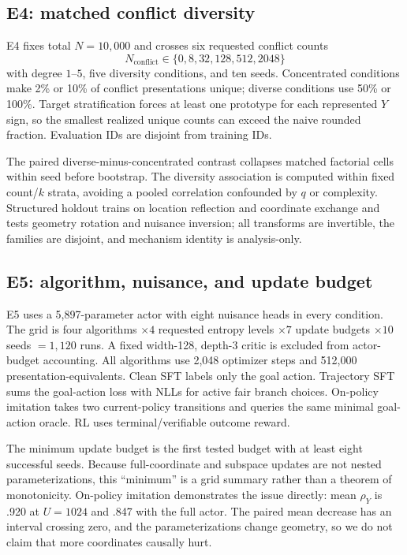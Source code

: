 \documentclass[11pt,a4paper]{article}
\newcommand{\rhoY}{\rho_Y}
\begin{document}
\subsection{E4: matched conflict diversity}

E4 fixes total $N=10{,}000$ and crosses six requested conflict counts
\[
N_{\mathrm{conflict}}\in\{0,8,32,128,512,2048\}
\]
with degree $1$--$5$, five diversity conditions, and ten seeds. Concentrated conditions make 2\% or 10\% of conflict presentations unique; diverse conditions use 50\% or 100\%. Target stratification forces at least one prototype for each represented $Y$ sign, so the smallest realized unique counts can exceed the naive rounded fraction. Evaluation IDs are disjoint from training IDs.

The paired diverse-minus-concentrated contrast collapses matched factorial cells within seed before bootstrap. The diversity association is computed within fixed count/$k$ strata, avoiding a pooled correlation confounded by $q$ or complexity. Structured holdout trains on location reflection and coordinate exchange and tests geometry rotation and nuisance inversion; all transforms are invertible, the families are disjoint, and mechanism identity is analysis-only.

\subsection{E5: algorithm, nuisance, and update budget}

E5 uses a 5,897-parameter actor with eight nuisance heads in every condition. The grid is four algorithms $\times4$ requested entropy levels $\times7$ update budgets $\times10$ seeds $=1{,}120$ runs. A fixed width-128, depth-3 critic is excluded from actor-budget accounting. All algorithms use 2,048 optimizer steps and 512,000 presentation-equivalents. Clean SFT labels only the goal action. Trajectory SFT sums the goal-action loss with NLLs for active fair branch choices. On-policy imitation takes two current-policy transitions and queries the same minimal goal-action oracle. RL uses terminal/verifiable outcome reward.

The minimum update budget is the first tested budget with at least eight successful seeds. Because full-coordinate and subspace updates are not nested parameterizations, this ``minimum'' is a grid summary rather than a theorem of monotonicity. On-policy imitation demonstrates the issue directly: mean $\rhoY$ is .920 at $U=1024$ and .847 with the full actor. The paired mean decrease has an interval crossing zero, and the parameterizations change geometry, so we do not claim that more coordinates causally hurt.
\end{document}
